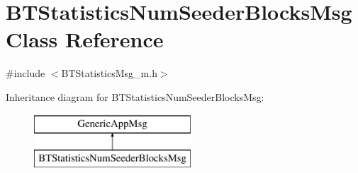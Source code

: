 \hypertarget{classBTStatisticsNumSeederBlocksMsg}{}\section{B\+T\+Statistics\+Num\+Seeder\+Blocks\+Msg Class Reference}
\label{classBTStatisticsNumSeederBlocksMsg}


{\ttfamily \#include $<$B\+T\+Statistics\+Msg\+\_\+m.\+h$>$}

Inheritance diagram for B\+T\+Statistics\+Num\+Seeder\+Blocks\+Msg\+:\begin{figure}[H]
\begin{center}
\leavevmode
\includegraphics[height=2.000000cm]{classBTStatisticsNumSeederBlocksMsg}
\end{center}
\end{figure}

